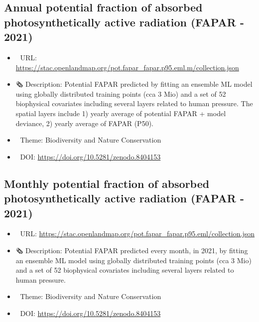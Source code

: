\documentclass[
  graybox,natbib,nospthms]{svmono}
\providecommand{\tightlist}{%
  \setlength{\itemsep}{0pt}\setlength{\parskip}{0pt}}
\providecommand{\tightlist}{\setlength{\itemsep}{0pt}\setlength{\parskip}{0pt}}
\begin{document}
\hypertarget{annual-potential-fraction-of-absorbed-photosynthetically-active-radiation-fapar---2021}{%
\subsection{Annual potential fraction of absorbed photosynthetically active radiation (FAPAR - 2021)}\label{annual-potential-fraction-of-absorbed-photosynthetically-active-radiation-fapar---2021}}

\begin{itemize}
\tightlist
\item
  🔗 URL: \url{https://stac.openlandmap.org/pot.fapar_fapar.p95.eml.m/collection.json}
\item
  🗞 Description: Potential FAPAR predicted by fitting an ensemble ML model using globally distributed training points (cca 3 Mio) and a set of 52 biophysical covariates including several layers related to human pressure. The spatial layers include 1) yearly average of potential FAPAR + model deviance, 2) yearly average of FAPAR (P50).
\item
  📝 Theme: Biodiversity and Nature Conservation
\item
  📂 DOI: \url{https://doi.org/10.5281/zenodo.8404153}
\end{itemize}

\hypertarget{monthly-potential-fraction-of-absorbed-photosynthetically-active-radiation-fapar---2021}{%
\subsection{Monthly potential fraction of absorbed photosynthetically active radiation (FAPAR - 2021)}\label{monthly-potential-fraction-of-absorbed-photosynthetically-active-radiation-fapar---2021}}

\begin{itemize}
\tightlist
\item
  🔗 URL: \url{https://stac.openlandmap.org/pot.fapar_fapar.p95.eml/collection.json}
\item
  🗞 Description: Potential FAPAR predicted every month, in 2021, by fitting an ensemble ML model using globally distributed training points (cca 3 Mio) and a set of 52 biophysical covariates including several layers related to human pressure.
\item
  📝 Theme: Biodiversity and Nature Conservation
\item
  📂 DOI: \url{https://doi.org/10.5281/zenodo.8404153}
\end{itemize}
\end{document}
